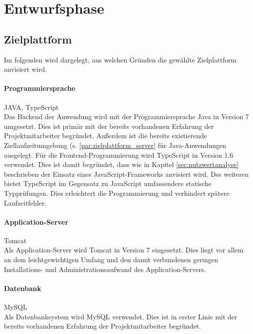 \documentclass[12pt, xcolor=dvipsnames]{scrartcl}
\begin{document}
\section{Entwurfsphase}

\subsection{Zielplattform}

Im folgenden wird dargelegt, aus welchen Gründen die gewählte Zielplattform anvisiert wird.

\paragraph{Programmiersprache} JAVA, TypeScript \\
Das Backend der Anwendung wird mit der Programmiersprache Java in Version 7 umgesetzt.
Dies ist primär mit der bereits vorhandenen Erfahrung der Projektmitarbeiter begründet. Außerdem ist die bereits existierende Ziellaufzeitumgebung (s. \ref{par:zielplattform_server} für Java-Anwendungen ausgelegt.
Für die Frontend-Programmierung wird TypeScript in Version 1.6 verwendet. Dies ist damit begründet, dass wie in Kapitel \ref{sec:nutzwertanalyse} beschrieben der Einsatz eines JavaScript-Frameworks anvisiert wird. Des weiteren bietet TypeScript im Gegensatz zu JavaScript umfassendere statische Typprüfungen. Dies erleichtert die Programmierung und verhindert spätere Laufzeitfehler.

\paragraph{Application-Server} Tomcat \\
Als Application-Server wird Tomcat in Version 7 eingesetzt. Dies liegt vor allem an dem leichtgewichtigen Umfang und den damit verbundenen geringen Installations- und Administrationsaufwand des Application-Servers. 

\paragraph{Datenbank} MySQL \\
Als Datenbanksystem wird MySQL verwendet. Dies ist in erster Linie mit der bereits vorhandenen Erfahrung der Projektmitarbeiter begründet.
\end{document}
